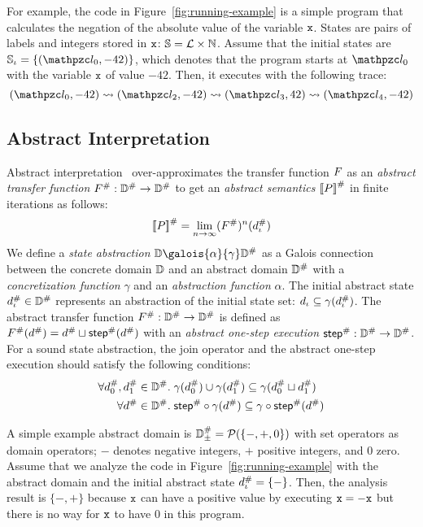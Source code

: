 For example, the code in Figure~\ref{fig:running-example} is a simple program
that calculates the negation of the absolute value of the variable $\texttt{x}$.
States are pairs of labels and integers stored in $\texttt{x}$: $\mathbb{S} = \mathcal{L}
\times \mathbb{N}$.  Assume that the initial states are $\istset = \{ (\lab_0,
-42) \}$, which denotes that the program starts at $\lab_0$
with the variable $\texttt{x}$ of value $-42$.
Then, it executes with the following trace:
\[
  (\lab_0, -42) \trans (\lab_2, -42) \trans (\lab_3, 42) \trans (\lab_4, -42)
\]


\subsection{Abstract Interpretation}\label{sec:ai}
Abstract interpretation~\cite{abs-interp-1977, abs-interp-1992}
over-approximates the transfer function $F$ as an \textit{abstract transfer
function} ${F}^{\#}: {\mathbb{D}}^{\#} \rightarrow {\mathbb{D}}^{\#}$ to get an
\textit{abstract semantics} ${[\![{P}]\!]}^{\#}$ in finite iterations as follows:
\[
    {[\![{P}]\!]}^{\#} = \underset{n \rightarrow
    \infty}{\lim}{({F}^{\#})^n({d}^{\#}_\iota)}\\
\]
We define a \textit{state abstraction} $\dom \galois{\alpha}{\gamma} \absdom$ as
a Galois connection between the concrete domain $\mathbb{D}$ and an abstract domain
${\mathbb{D}}^{\#}$ with a \textit{concretization function} $\gamma$ and an
\textit{abstraction function} $\alpha$.  The initial abstract state ${d}^{\#}_\iota
\in {\mathbb{D}}^{\#}$ represents an abstraction of the initial state set: $d_\iota
\subseteq \gamma({d}^{\#}_\iota)$.  The abstract transfer function ${F}^{\#}:
{\mathbb{D}}^{\#} \rightarrow {\mathbb{D}}^{\#}$ is defined as ${F}^{\#}({d}^{\#}) = {d}^{\#}
\sqcup {\textsf{step}}^{\#}({d}^{\#})$ with an \textit{abstract one-step execution}
${\textsf{step}}^{\#}: {\mathbb{D}}^{\#} \rightarrow {\mathbb{D}}^{\#}$.  For a sound state abstraction, the
join operator and the abstract one-step execution should satisfy the following
conditions:
\begin{align}
  \forall {d}^{\#}_0, {d}^{\#}_1 \in {\mathbb{D}}^{\#} & . \; \gamma({d}^{\#}_0) \cup
  \gamma({d}^{\#}_1) \subseteq \gamma({d}^{\#}_0 \sqcup
  {d}^{\#}_1) \label{equ:sound-join}\\
  \forall {d}^{\#} \in {\mathbb{D}}^{\#} & . \; {\textsf{step}}^{\#} \circ \gamma({d}^{\#}) \subseteq
  \gamma \circ {\textsf{step}}^{\#}({d}^{\#}) \label{equ:sound-step}
\end{align}

A simple example abstract domain is ${\mathbb{D}}^{\#}_\pm = \mathcal{P}(\{ -, +, 0 \})$ with
set operators as domain operators; $-$ denotes negative integers, $+$ positive
integers, and $0$ zero.  Assume that we analyze the code in
Figure~\ref{fig:running-example} with the abstract domain and the initial abstract state ${d}^{\#}_\iota =
\{ - \}$. Then, the analysis result is $\{ -, + \}$ because $\texttt{x}$ can
have a positive value by executing $\texttt{x} = -\texttt{x}$ but there is no
way for $\texttt{x}$ to have $0$ in this program.


